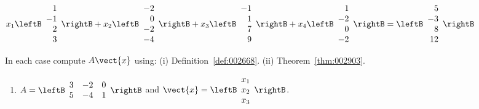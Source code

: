 \begin{multicols}{2}
\begin{ex}
\begin{enumerate}[label={\alph*.}]
\end{enumerate}
\begin{sol}
\begin{enumerate}[label={\alph*.}]
\setcounter{enumi}{1}
$
x_{1} \leftB \begin{array}{r}
1 \\
-1 \\
2 \\
3
\end{array} \rightB + 
x_{2} \leftB \begin{array}{r}
-2 \\
0 \\
-2 \\
-4
\end{array} \rightB + 
x_{3} \leftB \begin{array}{r}
-1 \\
1 \\
7 \\
9
\end{array} \rightB + 
x_{4} \leftB \begin{array}{r}
1 \\
-2 \\
0 \\
-2
\end{array} \rightB = 
\leftB \begin{array}{r}
5 \\
-3 \\
8 \\
12
\end{array} \rightB
$


\end{enumerate}
\end{sol}
\end{ex}

\begin{ex}
In each case compute $A\vect{x}$ using: (i) Definition~\ref{def:002668}. (ii) Theorem~\ref{thm:002903}.


\begin{enumerate}[label={\alph*.}]
\item 
$A = \leftB \begin{array}{rrr}
3 & -2 & 0 \\
5 & -4 & 1
\end{array} \rightB $ and $\vect{x} = \leftB \begin{array}{c}
x_{1} \\
x_{2} \\
x_{3}
\end{array} \rightB$.


\end{enumerate}
\end{ex}
\end{multicols}
